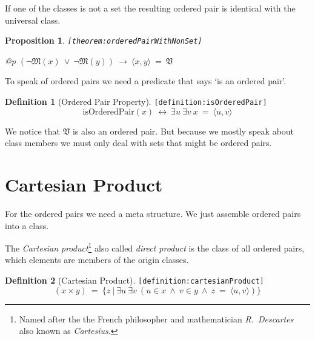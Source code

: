 \documentclass[a4paper,german,10pt,twoside]{book}
\newtheorem{prop}[thm]{Proposition}
\theoremstyle{definition}
\newtheorem{defn}{Definition}
\theoremstyle{remark}
\begin{document}
\par
If one of the classes is not a set the resulting ordered pair is 
identical with the universal class.

\begin{prop}
\label{theorem:orderedPairWithNonSet} \hypertarget{theorem:orderedPairWithNonSet}{}
{\tt \tiny [\verb]theorem:orderedPairWithNonSet]]}
\mbox{}
\begin{longtable}{{@{\extracolsep{\fill}}p{\linewidth}}}
\centering $(\neg \mathfrak{M}(x)\ \lor\ \neg \mathfrak{M}(y))\ \rightarrow\ \langle x, y \rangle \ = \ \mathfrak{V}$
\end{longtable}

\end{prop}


\par
To speak of ordered pairs we need a predicate that says `is an ordered pair'.

\begin{defn}[Ordered Pair Property]
\label{definition:isOrderedPair} \hypertarget{definition:isOrderedPair}{}
{\tt \tiny [\verb]definition:isOrderedPair]]}
$$\mbox{isOrderedPair}(x)\ \leftrightarrow\ \exists u\ \exists v\ x \ = \ \langle u, v \rangle$$

\end{defn}

We notice that $\mathfrak{V}$ is also an ordered pair. But because we mostly speak
about class members we must only deal with sets that might be ordered pairs.


\section{Cartesian Product} \label{chapter5_section3} \hypertarget{chapter5_section3}{}
For the ordered pairs we need a meta structure. We just assemble ordered pairs into a class.

\par
The \emph{Cartesian product}\footnote{Named after the the French philosopher and mathematician \emph{R.~Descartes} also known as \emph{Cartesius}.} also called \emph{direct product} is the class of all ordered pairs, which elements are members of the origin classes.

\begin{defn}[Cartesian Product]
\label{definition:cartesianProduct} \hypertarget{definition:cartesianProduct}{}
{\tt \tiny [\verb]definition:cartesianProduct]]}
$$( x \times y) \ = \ \{ z \ | \ \exists u\ \exists v\ (u \in x\ \land\ v \in y\ \land\ z \ = \ \langle u, v \rangle) \} $$
\end{defn}
\end{document}
